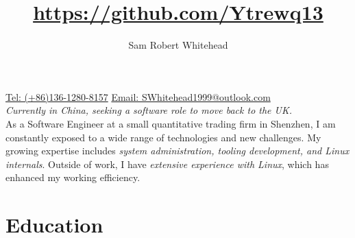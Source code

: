 



\title{\url{https://github.com/Ytrewq13}}
\author{Sam Robert Whitehead}

\maketitle

\pagestyle{empty}
\thispagestyle{empty}

\href{tel:(+86)13612808157}{Tel: (+86)136-1280-8157} \hfill
\href{mailto:SWhitehead1999@outlook.com}{Email: SWhitehead1999@outlook.com}
\\
\textit{Currently in China, seeking a software role to move back to the UK.}
\\
As a Software Engineer at a small quantitative trading firm in Shenzhen, I
am constantly exposed to a wide range of technologies and new challenges. My
growing expertise includes \emph{system administration, tooling development,
and Linux internals}. Outside of work, I have \emph{extensive experience with
Linux}, which has enhanced my working efficiency.

\section{Education}
